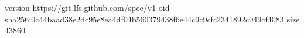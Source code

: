 version https://git-lfs.github.com/spec/v1
oid sha256:0c44baad38e2dc95e8ea4df04b560379438f6e44c9c9cfc2341892c049cf4083
size 43860
